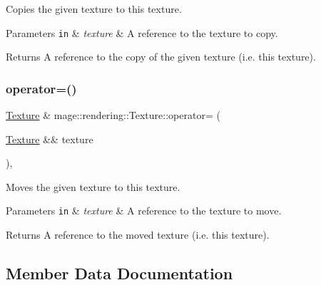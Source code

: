 Copies the given texture to this texture.


\begin{DoxyParams}[1]{Parameters}
\mbox{\tt in}  & {\em texture} & A reference to the texture to copy. \\
\hline
\end{DoxyParams}
\begin{DoxyReturn}{Returns}
A reference to the copy of the given texture (i.\+e. this texture). 
\end{DoxyReturn}
\mbox{\label{classmage_1_1rendering_1_1_texture_a8c9062f5d8045272c254eb0fa1ab4feb}} 
\subsubsection{\texorpdfstring{operator=()}{operator=()}\hspace{0.1cm}{\footnotesize\ttfamily [2/2]}}
{\footnotesize\ttfamily \mbox{\hyperlink{classmage_1_1rendering_1_1_texture}{Texture}} \& mage\+::rendering\+::\+Texture\+::operator= (\begin{DoxyParamCaption}\item[{\mbox{\hyperlink{classmage_1_1rendering_1_1_texture}{Texture}} \&\&}]{texture }\end{DoxyParamCaption})\hspace{0.3cm}{\ttfamily [default]}, {\ttfamily [noexcept]}}

Moves the given texture to this texture.


\begin{DoxyParams}[1]{Parameters}
\mbox{\tt in}  & {\em texture} & A reference to the texture to move. \\
\hline
\end{DoxyParams}
\begin{DoxyReturn}{Returns}
A reference to the moved texture (i.\+e. this texture). 
\end{DoxyReturn}


\subsection{Member Data Documentation}
\mbox{\label{classmage_1_1rendering_1_1_texture_a71312b72f42a9a6a90c0b4555e586308}} 
